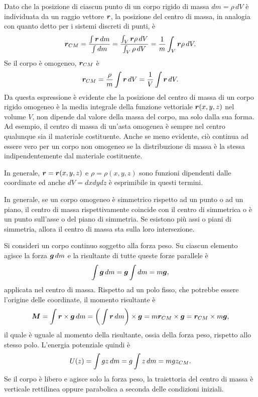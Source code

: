 Dato che la posizione di ciascun punto di un corpo rigido di massa $dm=\rho\,dV$ è individuata da un raggio vettore $\bm{r}$, la posizione del centro di massa, in analogia con quanto detto per i sistemi discreti di punti, è
\begin{equation}
    \bm{r}_{CM}=\frac{\int\bm{r}\,dm}{\int dm}=\frac{\int_V\bm{r}\rho\,dV}{\int_V\rho\,dV}=\frac{1}{m}\int_V\bm{r}\rho\,dV.
\end{equation}
Se il corpo è omogeneo, $\bm{r}_{CM}$ è
\begin{equation}
    \bm{r}_{CM}=\frac{\rho}{m}\int\bm{r}\,dV=\frac{1}{V}\int\bm{r}\,dV.
\end{equation}
Da questa espressione è evidente che la posizione del centro di massa di un corpo rigido omogeneo è la media integrale della funzione vettoriale $\bm{r}(x,y,z)$ nel volume $V$, non dipende dal valore della massa del corpo, ma solo dalla sua forma. Ad esempio, il centro di massa di un'asta omogenea è sempre nel centro qualunque sia il materiale costituente. Anche se meno evidente, ciò continua ad essere vero per un corpo non omogeneo se la distribuzione di massa è la stessa indipendentemente dal materiale costituente. 
\begin{obs}
    In generale, $\bm{r}=\bm{r}(x,y,z)$ e $\rho=\rho(x,y,z)$ sono funzioni dipendenti dalle coordinate ed anche $dV=dxdydz$ è esprimibile in questi termini. 
\end{obs}
In generale, se un corpo omogeneo è simmetrico rispetto ad un punto o ad un piano, il centro di massa rispettivamente coincide con il centro di simmetrica o è un punto sull'asse o del piano di simmetria. Se esistono più assi o piani di simmetria, allora il centro di massa sta sulla loro intersezione. 

Si consideri un corpo continuo soggetto alla forza peso. Su ciascun elemento agisce la forza $\bm{g}\,dm$ e la risultante di tutte queste forze parallele è
\begin{equation}
    \int\bm{g}\,dm=\bm{g}\int dm=m\bm{g},
\end{equation}
applicata nel centro di massa. Rispetto ad un polo fisso, che potrebbe essere l'origine delle coordinate, il momento risultante è
\begin{equation}
    \bm{M}=\int\bm{r}\times\bm{g}\,dm=\bigg(\int\bm{r}\,dm\bigg)\times\bm{g}=m\bm{r}_{CM}\times\bm{g}=\bm{r}_{CM}\times m\bm{g},
\end{equation}
il quale è uguale al momento della risultante, ossia della forza peso, rispetto allo stesso polo. L'energia potenziale quindi è
\begin{equation}
    U(z)=\int g z\,dm=g\int z\,dm=mgz_{CM}.
\end{equation}
Se il corpo è libero e agisce solo la forza peso, la traiettoria del centro di massa è verticale rettilinea oppure parabolica a seconda delle condizioni iniziali.

